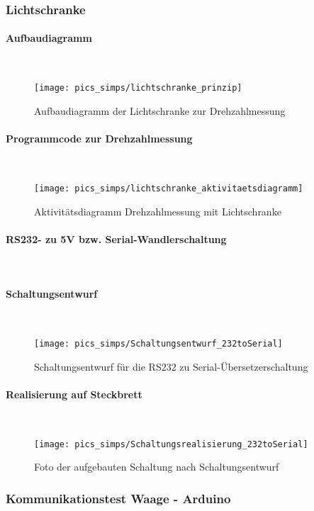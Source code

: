 \documentclass[12pt,a4paper]{article}
\begin{document}
\subsubsection{Lichtschranke}
%
\paragraph{Aufbaudiagramm}\mbox{}\\
\begin{figure}[h!]
	\centering
	\texttt{[image: pics\_simps/lichtschranke\_prinzip]}
	\caption{Aufbaudiagramm der Lichtschranke zur Drehzahlmessung}
\end{figure}
%
\newpage
\paragraph{Programmcode zur Drehzahlmessung}\mbox{}\\
\begin{figure}[h!]
	\centering
	\texttt{[image: pics\_simps/lichtschranke\_aktivitaetsdiagramm]}
	\caption{Aktivitätsdiagramm Drehzahlmessung mit Lichtschranke}
\end{figure}
%
\paragraph{RS232- zu 5V bzw. Serial-Wandlerschaltung}\mbox{}\\
\paragraph{Schaltungsentwurf}\mbox{}\\
\begin{figure}[h!]
	\centering
	\texttt{[image: pics\_simps/Schaltungsentwurf\_232toSerial]}
	\caption{Schaltungsentwurf für die RS232 zu Serial-Übersetzerschaltung}
\end{figure}
%
\newpage
\paragraph{Realisierung auf Steckbrett}\mbox{}\\
\begin{figure}[h!]
	\centering
	\texttt{[image: pics\_simps/Schaltungsrealisierung\_232toSerial]}
	\caption{Foto der aufgebauten Schaltung nach Schaltungsentwurf}
\end{figure}
%
\newpage
\subsubsection{Kommunikationstest Waage - Arduino}
%
\end{document}
